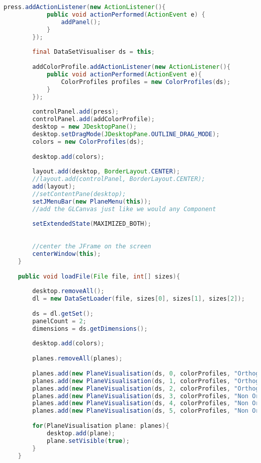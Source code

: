 \documentclass[pdftex,a4paper,10pt,titlepage]{article}
\begin{document}
\begin{lstlisting}[language=java, breaklines=true]
        press.addActionListener(new ActionListener(){
            public void actionPerformed(ActionEvent e) {
                addPanel();
            }
        });
        
        final DataSetVisualiser ds = this;
        
        addColorProfile.addActionListener(new ActionListener(){
            public void actionPerformed(ActionEvent e){
                ColorProfiles profiles = new ColorProfiles(ds);
            }
        });
        
        controlPanel.add(press);
        controlPanel.add(addColorProfile);
        desktop = new JDesktopPane();
        desktop.setDragMode(JDesktopPane.OUTLINE_DRAG_MODE);
        colors = new ColorProfiles(ds);
        
        desktop.add(colors);
        
        layout.add(desktop, BorderLayout.CENTER);
        //layout.add(controlPanel, BorderLayout.CENTER);
        add(layout);
        //setContentPane(desktop);
        setJMenuBar(new PlaneMenu(this));
        //add the GLCanvas just like we would any Component
        
        setExtendedState(MAXIMIZED_BOTH);
        
        
        //center the JFrame on the screen
        centerWindow(this);
    }
    
    public void loadFile(File file, int[] sizes){
        
        desktop.removeAll();
        dl = new DataSetLoader(file, sizes[0], sizes[1], sizes[2]);
        
        ds = dl.getSet();
        panelCount = 2;
        dimensions = ds.getDimensions();
        
        desktop.add(colors);
        
        planes.removeAll(planes);
        
        planes.add(new PlaneVisualisation(ds, 0, colorProfiles, "Orthogonal X")); 
        planes.add(new PlaneVisualisation(ds, 1, colorProfiles, "Orthogonal Y"));
        planes.add(new PlaneVisualisation(ds, 2, colorProfiles, "Orthogonal Z"));
        planes.add(new PlaneVisualisation(ds, 3, colorProfiles, "Non Orthogonal X"));
        planes.add(new PlaneVisualisation(ds, 4, colorProfiles, "Non Orthogonal Y"));
        planes.add(new PlaneVisualisation(ds, 5, colorProfiles, "Non Orthogonal Z"));
        
        for(PlaneVisualisation plane: planes){
            desktop.add(plane);
            plane.setVisible(true);
        }
    }
    

\end{lstlisting}
\end{document}
